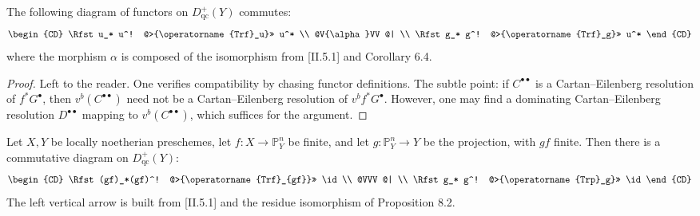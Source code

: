 
\setcounter{page}{205}
\begin{proposition}
The following diagram of functors on \(D_{\mathrm{qc}}^+(Y)\) commutes:
\[
\begin{CD}
\Rfst u_* u^! @>{\operatorname{Trf}_u}>> u^* \\
@V{\alpha}VV @| \\
\Rfst g_* g^! @>{\operatorname{Trf}_g}>> u^*
\end{CD}
\]
where the morphism \(\alpha\) is composed of the isomorphism from [II.5.1] and Corollary 6.4.
\end{proposition}

\begin{proof}
Left to the reader. One verifies compatibility by chasing functor definitions. The subtle point: if \(C^{\bullet\bullet}\) is a Cartan--Eilenberg resolution of \(f^*G^\bullet\), then \(v^b(C^{\bullet\bullet})\) need not be a Cartan--Eilenberg resolution of \(v^b f^*G^\bullet\). However, one may find a dominating Cartan--Eilenberg resolution \(D^{\bullet\bullet}\) mapping to \(v^b(C^{\bullet\bullet})\), which suffices for the argument.
\end{proof}

\setcounter{page}{206}
\begin{proposition}
Let \(X,Y\) be locally noetherian preschemes, let \(f\colon X\to\mathbb{P}_Y^n\) be finite, and let \(g\colon\mathbb{P}_Y^n\to Y\) be the projection, with \(gf\) finite. Then there is a commutative diagram on \(D_{\mathrm{qc}}^+(Y)\):
\[
\begin{CD}
\Rfst(gf)_*(gf)^! @>{\operatorname{Trf}_{gf}}>> \id \\
@VVV @| \\
\Rfst g_* g^! @>{\operatorname{Trp}_g}>> \id
\end{CD}
\]
The left vertical arrow is built from [II.5.1] and the residue isomorphism of Proposition 8.2.
\end{proposition}

